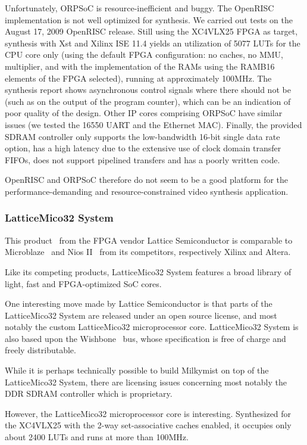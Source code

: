 \documentclass[a4paper,11pt]{kthesis}
\begin{document}
Unfortunately, ORPSoC is resource-inefficient and buggy. The OpenRISC implementation is not well optimized for synthesis. We carried out tests on the August 17, 2009 OpenRISC release. Still using the XC4VLX25 FPGA as target, synthesis with Xst and Xilinx ISE 11.4 yields an utilization of 5077 LUTs for the CPU core only (using the default FPGA configuration: no caches, no MMU, multiplier, and with the implementation of the RAMs using the RAMB16 elements of the FPGA selected), running at approximately 100MHz. The synthesis report shows asynchronous control signals where there should not be (such as on the output of the program counter), which can be an indication of poor quality of the design. Other IP cores comprising ORPSoC have similar issues (we tested the 16550 UART and the Ethernet MAC). Finally, the provided SDRAM controller only supports the low-bandwidth 16-bit single data rate option, has a high latency due to the extensive use of clock domain transfer FIFOs, does not support pipelined transfers and has a poorly written code.

OpenRISC and ORPSoC therefore do not seem to be a good platform for the performance-demanding and resource-constrained video synthesis application.

\subsubsection{LatticeMico32 System}
This product~\cite{mico32} from the FPGA vendor Lattice Semiconductor is comparable to Microblaze~\cite{microblaze} and Nios II~\cite{nios} from its competitors, respectively Xilinx and Altera.

Like its competing products, LatticeMico32 System features a broad library of light, fast and FPGA-optimized SoC cores.

One interesting move made by Lattice Semiconductor is that parts of the LatticeMico32 System are released under an open source license, and most notably the custom LatticeMico32 microprocessor core. LatticeMico32 System is also based upon the Wishbone~\cite{wishbone} bus, whose specification is free of charge and freely distributable.

While it is perhaps technically possible to build Milkymist on top of the LatticeMico32 System, there are licensing issues concerning most notably the DDR SDRAM controller which is proprietary.

However, the LatticeMico32 microprocessor core is interesting. Synthesized for the XC4VLX25 with the 2-way set-associative caches enabled, it occupies only about 2400 LUTs and runs at more than 100MHz.
\end{document}
